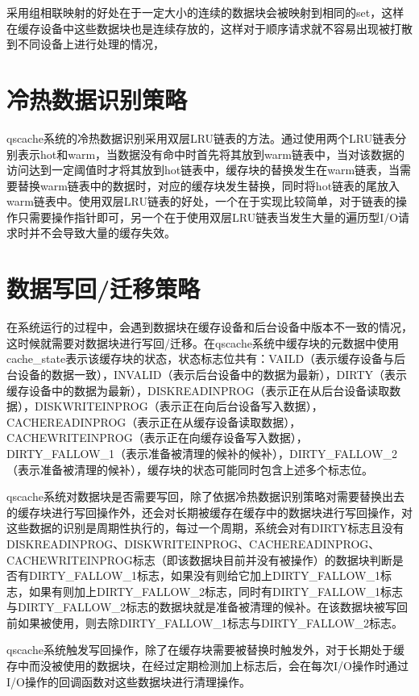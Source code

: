 采用组相联映射的好处在于一定大小的连续的数据块会被映射到相同的set，这样在缓存设备中这些数据块也是连续存放的，这样对于顺序请求就不容易出现被打散到不同设备上进行处理的情况，

\section{冷热数据识别策略}
\label{sec:data_hot_identification}

qscache系统的冷热数据识别采用双层LRU链表的方法。通过使用两个LRU链表分别表示hot和warm，当数据没有命中时首先将其放到warm链表中，当对该数据的访问达到一定阈值时才将其放到hot链表中，缓存块的替换发生在warm链表，当需要替换warm链表中的数据时，对应的缓存块发生替换，同时将hot链表的尾放入warm链表中。使用双层LRU链表的好处，一个在于实现比较简单，对于链表的操作只需要操作指针即可，另一个在于使用双层LRU链表当发生大量的遍历型I/O请求时并不会导致大量的缓存失效。

\section{数据写回/迁移策略}

在系统运行的过程中，会遇到数据块在缓存设备和后台设备中版本不一致的情况，这时候就需要对数据块进行写回/迁移。在qscache系统中缓存块的元数据中使用cache\_state表示该缓存块的状态，状态标志位共有：VAILD（表示缓存设备与后台设备的数据一致），INVALID（表示后台设备中的数据为最新），DIRTY（表示缓存设备中的数据为最新），DISKREADINPROG（表示正在从后台设备读取数据），DISKWRITEINPROG（表示正在向后台设备写入数据），CACHEREADINPROG（表示正在从缓存设备读取数据），CACHEWRITEINPROG（表示正在向缓存设备写入数据），DIRTY\_FALLOW\_1（表示准备被清理的候补的候补），DIRTY\_FALLOW\_2（表示准备被清理的候补），缓存块的状态可能同时包含上述多个标志位。

qscache系统对数据块是否需要写回，除了依据冷热数据识别策略对需要替换出去的缓存块进行写回操作外，还会对长期被缓存在缓存中的数据块进行写回操作，对这些数据的识别是周期性执行的，每过一个周期，系统会对有DIRTY标志且没有DISKREADINPROG、DISKWRITEINPROG、CACHEREADINPROG、CACHEWRITEINPROG标志（即该数据块目前并没有被操作）的数据块判断是否有DIRTY\_FALLOW\_1标志，如果没有则给它加上DIRTY\_FALLOW\_1标志，如果有则加上DIRTY\_FALLOW\_2标志，同时有DIRTY\_FALLOW\_1标志与DIRTY\_FALLOW\_2标志的数据块就是准备被清理的候补。在该数据块被写回前如果被使用，则去除DIRTY\_FALLOW\_1标志与DIRTY\_FALLOW\_2标志。

qscache系统触发写回操作，除了在缓存块需要被替换时触发外，对于长期处于缓存中而没被使用的数据块，在经过定期检测加上标志后，会在每次I/O操作时通过I/O操作的回调函数对这些数据块进行清理操作。



